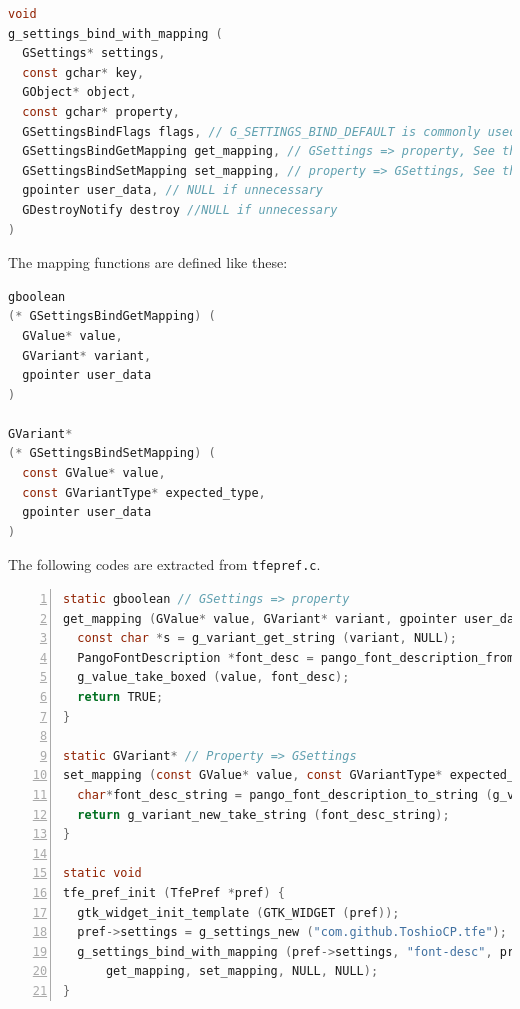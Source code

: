 \begin{lstlisting}[language=C]
void
g_settings_bind_with_mapping (
  GSettings* settings,
  const gchar* key,
  GObject* object,
  const gchar* property,
  GSettingsBindFlags flags, // G_SETTINGS_BIND_DEFAULT is commonly used
  GSettingsBindGetMapping get_mapping, // GSettings => property, See the example below
  GSettingsBindSetMapping set_mapping, // property => GSettings, See the example below
  gpointer user_data, // NULL if unnecessary
  GDestroyNotify destroy //NULL if unnecessary
)
\end{lstlisting}

The mapping functions are defined like these:

\begin{lstlisting}[language=C]
gboolean
(* GSettingsBindGetMapping) (
  GValue* value,
  GVariant* variant,
  gpointer user_data
)

GVariant*
(* GSettingsBindSetMapping) (
  const GValue* value,
  const GVariantType* expected_type,
  gpointer user_data
)
\end{lstlisting}

The following codes are extracted from
\passthrough{\lstinline!tfepref.c!}.

\begin{lstlisting}[language=C, numbers=left]
static gboolean // GSettings => property
get_mapping (GValue* value, GVariant* variant, gpointer user_data) {
  const char *s = g_variant_get_string (variant, NULL);
  PangoFontDescription *font_desc = pango_font_description_from_string (s);
  g_value_take_boxed (value, font_desc);
  return TRUE;
}

static GVariant* // Property => GSettings
set_mapping (const GValue* value, const GVariantType* expected_type, gpointer user_data) {
  char*font_desc_string = pango_font_description_to_string (g_value_get_boxed (value));
  return g_variant_new_take_string (font_desc_string);
}

static void
tfe_pref_init (TfePref *pref) {
  gtk_widget_init_template (GTK_WIDGET (pref));
  pref->settings = g_settings_new ("com.github.ToshioCP.tfe");
  g_settings_bind_with_mapping (pref->settings, "font-desc", pref->font_dialog_btn, "font-desc", G_SETTINGS_BIND_DEFAULT,
      get_mapping, set_mapping, NULL, NULL);
}
\end{lstlisting}

